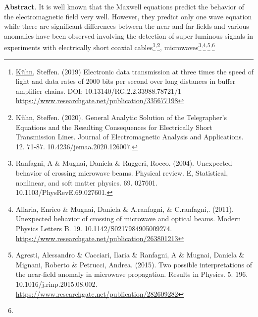 \documentclass[a4paper]{article}
\newcommand\textstyleNone[1]{#1}
\begin{document}
{

\textbf{{Abstract}}{.
It is well known that the Maxwell equations predict the behavior of the
electromagnetic field very well. However, they predict only one wave equation
while there are significant differences between the
{\textquotedbl}near{\textquotedbl} and {\textquotedbl}far{\textquotedbl} fields
and various anomalies have been observed involving the detection of super
luminous signals in experiments with electrically short coaxial
cables}\footnote{
\href{https://www.researchgate.net/profile/Steffen-Kuehn-3?_sg\%5B0\%5D=zlLZ0Gbl1GNlaEJvpgGlVutlqzhUsFGEl-EZkXLnMKvKykRtWeKzdlCZ2I4o0ixYK73oKKY.8mfcbtOw1v3oZSHsL8aIQtbCwx_4U6Di5vqQ84O5mnn8TnI7pcEwkxjCffJUXI-C5Kre7wRGShKiT7EGeFY9qg&_sg\%5B1\%5D=WUlVJagcaa-si2q-5nMYe4qf09LJiCKvtcIrx5Iyn0639PGnwxYpSZoBHKhgJEBMRVUxBy0.WqE4nE0I582CEhQgcvCR_67us9bpt94MFGuqsz2FgFJjxM1_QQ8YD0ErlNpA3_vvRvmJlhhX60C8i0OUaTLTEw}{K\"uhn},
Steffen. (2019) Electronic data transmission at three times the speed of light
and data rates of 2000 bits per second over long distances in buffer amplifier
chains. DOI: 10.13140/RG.2.2.33988.78721/1
\url{https://www.researchgate.net/publication/335677198} \par
}{\textsuperscript{,}}\footnote{
K\"uhn, Steffen. (2020). General Analytic Solution of the Telegrapher's
Equations and the Resulting Consequences for Electrically Short Transmission
Lines. Journal of Electromagnetic Analysis and Applications. 12. 71-87.
10.4236/jemaa.2020.126007. \par
}{, microwaves}\footnote{
Ranfagni, A \& Mugnai, Daniela \& Ruggeri, Rocco. (2004). Unexpected behavior of
crossing microwave beams. Physical review. E, Statistical, nonlinear, and soft
matter physics. 69. 027601. 10.1103/PhysRevE.69.027601.\par
}\textstyleNone{{\textsuperscript{,}}}\footnote{
Allaria, Enrico \& Mugnai, Daniela \& A.ranfagni, \& C.ranfagni,. (2011).
Unexpected behavior of crossing of microwave and optical beams. Modern Physics
Letters B. 19. 10.1142/S0217984905009274.
\url{https://www.researchgate.net/publication/263801213} \par
}\textstyleNone{{\textsuperscript{,}}}\footnote{
Agresti, Alessandro \& Cacciari, Ilaria \& Ranfagni, A \& Mugnai, Daniela \&
Mignani, Roberto \& Petrucci, Andrea. (2015). Two possible interpretations of
the near-field anomaly in microwave propagation. Results in Physics. 5. 196.
10.1016/j.rinp.2015.08.002.
\url{https://www.researchgate.net/publication/282609282} \par
}\textstyleNone{{\textsuperscript{,}}}\footnote{
}}
\end{document}
